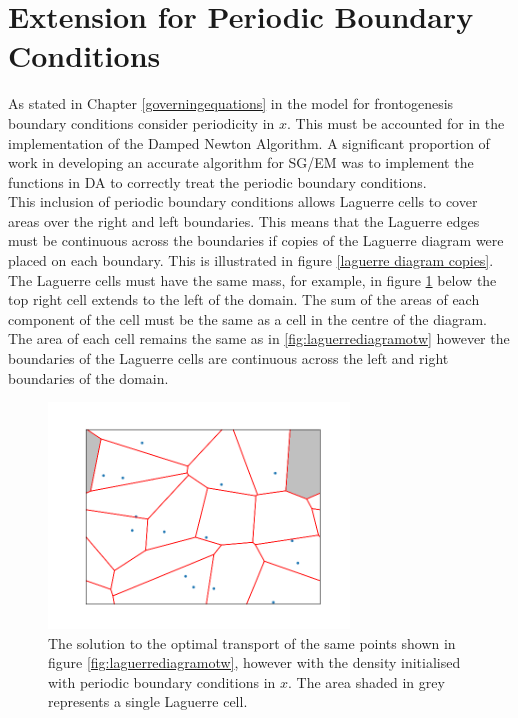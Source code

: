 \section{Extension for Periodic Boundary Conditions}
As stated in Chapter \ref{governingequations} in the model for frontogenesis boundary conditions consider periodicity in $x$. This must be accounted for in the implementation of the Damped Newton Algorithm. A significant proportion of work in developing an accurate algorithm for SG/EM was to implement the functions in DA to correctly treat the periodic boundary conditions. 
\\
\linebreak
This inclusion of periodic boundary conditions allows Laguerre cells to cover areas over the right and left boundaries. This means that the Laguerre edges must be continuous across the boundaries if copies of the Laguerre diagram were placed on each boundary. This is illustrated in figure \ref{laguerre diagram copies}. The Laguerre cells must have the same mass, for example, in figure \ref{fig:laguerrediagramotpw} below the top right cell extends to the left of the domain. The sum of the areas of each component of the cell must be the same as a cell in the centre of the diagram. The area of each cell remains the same as in \ref{fig:laguerrediagramotw} however the boundaries of the Laguerre cells are continuous across the left and right boundaries of the domain.
\begin{figure}[h]
	\centering
	\includegraphics[width=8cm]{project/laguerre_diagram_OTPw}
	\caption[Optimal Transport with Periodic Boundary Conditions]{The solution to the optimal transport of the same points shown in figure \ref{fig:laguerrediagramotw}, however with the density initialised with periodic boundary conditions in $x$. The area shaded in grey represents a single Laguerre cell.}
	\label{fig:laguerrediagramotpw}
\end{figure}
